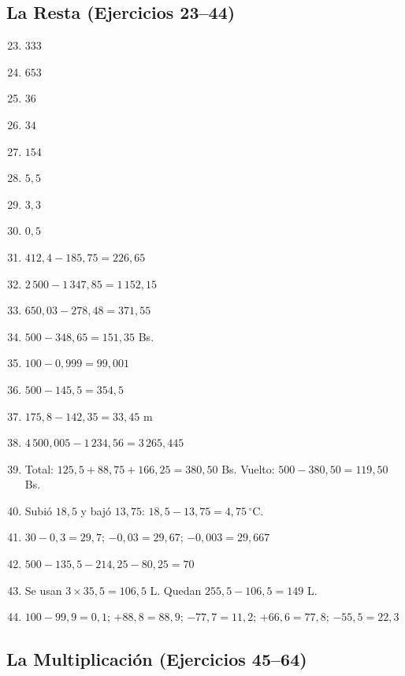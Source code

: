 \documentclass[12pt, letterpaper]{article}
\begin{document}
  \subsection*{La Resta (Ejercicios 23--44)}

  \begin{enumerate}[leftmargin=*, label=\textbf{\arabic*.}]
    \setcounter{enumi}{22}
    \item $333$
    \item $653$
    \item $36$
    \item $34$
    \item $154$
    \item $5{,}5$
    \item $3{,}3$
    \item $0{,}5$
    \item $412{,}4 - 185{,}75 = 226{,}65$
    \item $2\,500 - 1\,347{,}85 = 1\,152{,}15$
    \item $650{,}03 - 278{,}48 = 371{,}55$
    \item $500 - 348{,}65 = 151{,}35$ Bs.
    \item $100 - 0{,}999 = 99{,}001$
    \item $500 - 145{,}5 = 354{,}5$
    \item $175{,}8 - 142{,}35 = 33{,}45$ m
    \item $4\,500{,}005 - 1\,234{,}56 = 3\,265{,}445$
    \item Total: $125{,}5 + 88{,}75 + 166{,}25 = 380{,}50$ Bs. Vuelto: $500 - 380{,}50 = 119{,}50$ Bs.
    \item Subió $18{,}5$ y bajó $13{,}75$: $18{,}5 - 13{,}75 = 4{,}75\,^{\circ}$C.
    \item $30 - 0{,}3 = 29{,}7$; $- 0{,}03 = 29{,}67$; $- 0{,}003 = 29{,}667$
    \item $500 - 135{,}5 - 214{,}25 - 80{,}25 = 70$
    \item Se usan $3 \times 35{,}5 = 106{,}5$ L. Quedan $255{,}5 - 106{,}5 = 149$ L.
    \item $100 - 99{,}9 = 0{,}1$; $+ 88{,}8 = 88{,}9$; $- 77{,}7 = 11{,}2$; $+ 66{,}6 = 77{,}8$; $- 55{,}5 = 22{,}3$
  \end{enumerate}

  \subsection*{La Multiplicación (Ejercicios 45--64)}
\end{document}
